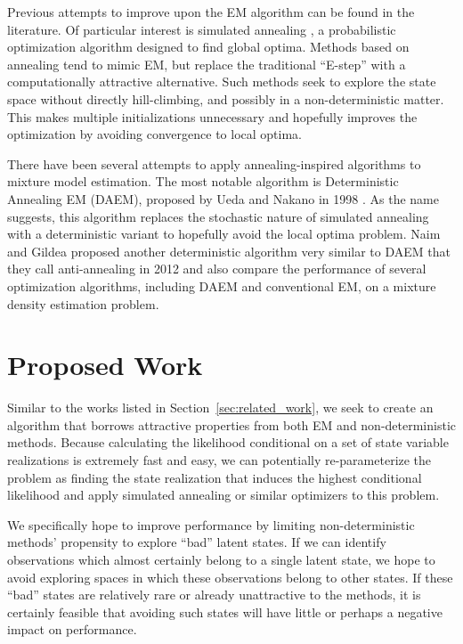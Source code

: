 \documentclass{article}
\theoremstyle{definition}
\begin{document}
Previous attempts to improve upon the EM algorithm can be found in the literature. Of particular interest is simulated annealing \cite{kirkpatrickgelattvecchi83}, a probabilistic optimization algorithm designed to find global optima. Methods based on annealing tend to mimic EM, but replace the traditional ``E-step'' with a computationally attractive alternative. Such methods seek to explore the state space without directly hill-climbing, and possibly in a non-deterministic matter. This makes multiple initializations unnecessary and hopefully improves the optimization by avoiding convergence to local optima.

There have been several attempts to apply annealing-inspired algorithms to mixture model estimation. The most notable algorithm is Deterministic Annealing EM (DAEM), proposed by Ueda and Nakano in 1998 \cite{uedanakano98}. As the name suggests, this algorithm replaces the stochastic nature of simulated annealing with a deterministic variant to hopefully avoid the local optima problem. Naim and Gildea proposed another deterministic algorithm very similar to DAEM that they call anti-annealing in 2012 \cite{naimgildea12} and also compare the performance of several optimization algorithms, including DAEM and conventional EM, on a mixture density estimation problem.


\section{Proposed Work}

Similar to the works listed in Section~\ref{sec:related_work}, we seek to create an algorithm that borrows attractive properties from both EM and non-deterministic methods.
Because calculating the likelihood conditional on a set of state variable realizations is extremely fast and easy, we can potentially re-parameterize the problem as finding the state realization that induces the highest conditional likelihood and apply simulated annealing or similar optimizers to this problem.

We specifically hope to improve performance by limiting non-deterministic methods' propensity to explore ``bad'' latent states. If we can identify observations which almost certainly belong to a single latent state, we hope to avoid exploring spaces in which these observations belong to other states. If these ``bad'' states are relatively rare or already unattractive to the methods, it is certainly feasible that avoiding such states will have little or perhaps a negative impact on performance.
\end{document}
